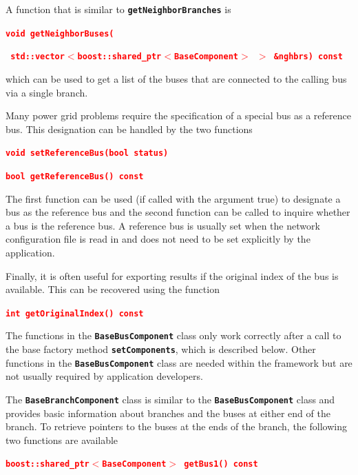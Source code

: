 \documentclass[12pt]{report} %
\begin{document}
A function that is similar to \texttt{\textbf{getNeighborBranches}} is

\textcolor{red}{\texttt{\textbf{void getNeighborBuses(}}}

\textcolor{red}{\texttt{\textbf{   std::vector$\boldsymbol{\mathrm{<}}$boost::shared\_ptr$\boldsymbol{\mathrm{<}}$BaseComponent$\boldsymbol{\mathrm{>}}$ $\boldsymbol{\mathrm{>}}$ \&nghbrs) const}}}

which can be used to get a list of the buses that are connected to the calling bus via a single branch.

Many power grid problems require the specification of a special bus as a reference bus. This designation can be handled by the two functions

\textcolor{red}{\texttt{\textbf{void setReferenceBus(bool status)}}}


\textcolor{red}{\texttt{\textbf{bool getReferenceBus() const}}}

The first function can be used (if called with the argument true) to designate a bus as the reference bus and the second function can be called to inquire whether a bus is the reference bus. A reference bus is usually set when the network configuration file is read in and does not need to be set explicitly by the application.

Finally, it is often useful for exporting results if the original index of the bus is available. This can be recovered using the function

\textcolor{red}{\texttt{\textbf{int getOriginalIndex() const}}}

The functions in the \texttt{\textbf{BaseBusComponent}} class only work correctly after a call to the base factory method \texttt{\textbf{setComponents}}, which is described below. Other functions in the \texttt{\textbf{BaseBusComponent}} class are needed within the framework but are not usually required by application developers.

The \texttt{\textbf{BaseBranchComponent}} class is similar to the \texttt{\textbf{BaseBusComponent}} class and provides basic information about branches and the buses at either end of the branch. To retrieve pointers to the buses at the ends of the branch, the following two functions are available

\textcolor{red}{\texttt{\textbf{boost::shared\_ptr$\boldsymbol{\mathrm{<}}$BaseComponent$\boldsymbol{\mathrm{>}}$ getBus1() const}}}
\end{document}
